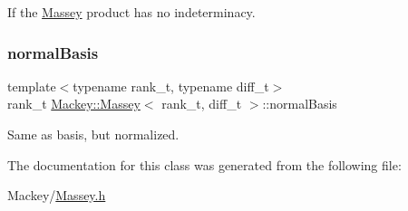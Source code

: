 If the \hyperlink{classMackey_1_1Massey}{Massey} product has no indeterminacy. 

\mbox{\label{classMackey_1_1Massey_a36e3aa9de7d7617feb243d886c5936c8}} 
\subsubsection{\texorpdfstring{normal\+Basis}{normalBasis}}
{\footnotesize\ttfamily template$<$typename rank\+\_\+t, typename diff\+\_\+t$>$ \\
rank\+\_\+t \hyperlink{classMackey_1_1Massey}{Mackey\+::\+Massey}$<$ rank\+\_\+t, diff\+\_\+t $>$\+::normal\+Basis}



Same as basis, but normalized. 



The documentation for this class was generated from the following file\+:\begin{DoxyCompactItemize}
\item 
Mackey/\hyperlink{Massey_8h}{Massey.\+h}\end{DoxyCompactItemize}
